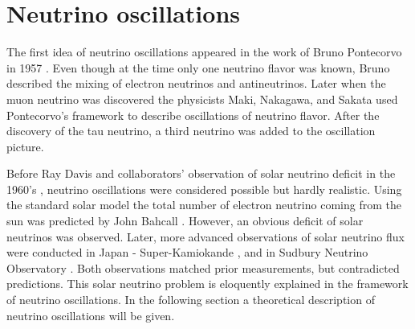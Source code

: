 \section{Neutrino oscillations}
The first idea of neutrino oscillations appeared in the work of Bruno Pontecorvo in 
1957 \cite{pontecorvo}. Even though at the time only one neutrino flavor was known, 
Bruno described the mixing of electron neutrinos and antineutrinos. Later when the muon 
neutrino was discovered the physicists Maki, Nakagawa, and Sakata used Pontecorvo's 
framework \cite{maki} to describe oscillations of neutrino flavor. After the discovery 
of the tau neutrino, a third neutrino was added to the oscillation picture.

Before Ray Davis and collaborators' observation of solar neutrino deficit in the 1960's 
\cite{davis}, neutrino oscillations were considered possible but hardly realistic. 
Using the standard solar model the total number of electron neutrino coming from the sun 
was predicted by John Bahcall \cite{bahcall}. However, an obvious deficit of solar 
neutrinos was observed. Later, more advanced observations of solar neutrino flux were 
conducted in Japan - Super-Kamiokande \cite{suzuki}, and in Sudbury Neutrino Observatory 
\cite{mcdonald}. Both observations matched prior measurements, but contradicted predictions. 
This solar neutrino problem is eloquently explained in the framework of neutrino oscillations. 
In the following section a theoretical description of neutrino oscillations will be given.


